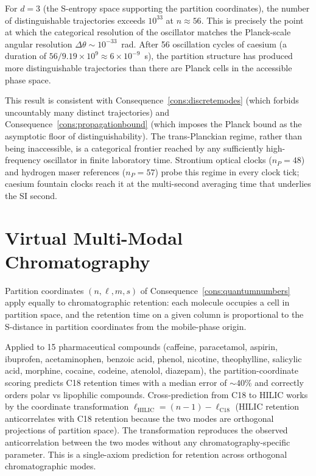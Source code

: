 \documentclass[11pt,twocolumn,a4paper]{article}
\theoremstyle{axiomstyle}
\theoremstyle{conseqstyle}
\theoremstyle{definition}
\theoremstyle{remark}
\begin{document}
For $d=3$ (the S-entropy space supporting the partition coordinates), the number of distinguishable trajectories exceeds $10^{33}$ at $n \approx 56$. This is precisely the point at which the categorical resolution of the oscillator matches the Planck-scale angular resolution $\Delta\theta \sim 10^{-33}$~rad. After 56 oscillation cycles of caesium (a duration of $56/9.19\times 10^{9} \approx 6\times 10^{-9}$~s), the partition structure has produced more distinguishable trajectories than there are Planck cells in the accessible phase space.

This result is consistent with Consequence~\ref{cons:discretemodes} (which forbids uncountably many distinct trajectories) and Consequence~\ref{cons:propagationbound} (which imposes the Planck bound as the asymptotic floor of distinguishability). The trans-Planckian regime, rather than being inaccessible, is a categorical frontier reached by any sufficiently high-frequency oscillator in finite laboratory time. Strontium optical clocks ($n_P=48$) and hydrogen maser references ($n_P=57$) probe this regime in every clock tick; caesium fountain clocks reach it at the multi-second averaging time that underlies the SI second.

\section{Virtual Multi-Modal Chromatography}
\label{sec:chromatographyvalidation}

Partition coordinates $(n, \ell, m, s)$ of Consequence~\ref{cons:quantumnumbers} apply equally to chromatographic retention: each molecule occupies a cell in partition space, and the retention time on a given column is proportional to the S-distance in partition coordinates from the mobile-phase origin.

Applied to 15 pharmaceutical compounds (caffeine, paracetamol, aspirin, ibuprofen, acetaminophen, benzoic acid, phenol, nicotine, theophylline, salicylic acid, morphine, cocaine, codeine, atenolol, diazepam), the partition-coordinate scoring predicts C18 retention times with a median error of $\sim 40$\% and correctly orders polar vs lipophilic compounds. Cross-prediction from C18 to HILIC works by the coordinate transformation $\ell_{\text{HILIC}} = (n-1) - \ell_{\text{C18}}$ (HILIC retention anticorrelates with C18 retention because the two modes are orthogonal projections of partition space). The transformation reproduces the observed anticorrelation between the two modes without any chromatography-specific parameter. This is a single-axiom prediction for retention across orthogonal chromatographic modes.
\end{document}
